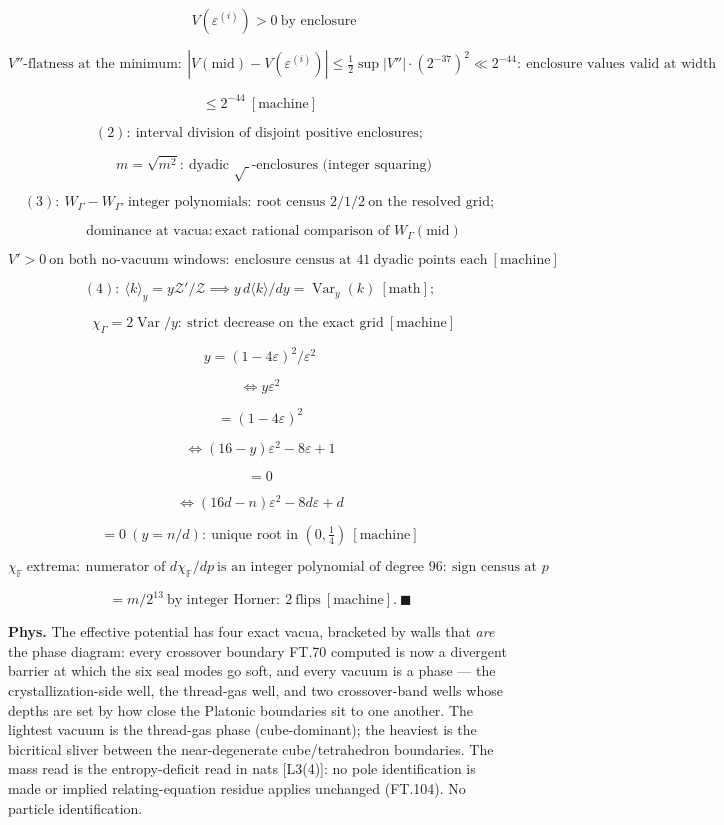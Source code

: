 \begin{theorem}
\[
\qquad V(\varepsilon^{(i)})>0\ \text{by enclosure}
\]

\[
V''\text{-flatness at the minimum}:\ |V(\text{mid})-V(\varepsilon^{(i)})|\le\tfrac12\sup|V''|\cdot(2^{-37})^2\ll2^{-44}:\ \text{enclosure values valid at width}
\]

\[
\le 2^{-44}\ [\text{machine}]
\]

\[
(2):\ \text{interval division of disjoint positive enclosures};
\]

\[
\qquad m=\sqrt{m^2}:\ \text{dyadic }\sqrt{\ }\text{-enclosures (integer squaring)}
\]

\[
(3):\ W_\Gamma-W_{\Gamma'}\ \text{integer polynomials}:\ \text{root census }2/1/2\ \text{on the resolved grid};
\]

\[
\qquad \text{dominance at vacua}: \text{exact rational comparison of }W_\Gamma(\text{mid})
\]

\[
V'>0\ \text{on both no-vacuum windows}:\ \text{enclosure census at }41\ \text{dyadic points each}\ [\text{machine}]
\]

\[
(4):\ \langle k\rangle_y=y\mathcal Z'/\mathcal Z\implies y\,d\langle k\rangle/dy=\operatorname{Var}_y(k)\ [\text{math}];
\]

\[
\qquad \chi_\Gamma=2\operatorname{Var}/y:\ \text{strict decrease on the exact grid}\ [\text{machine}]
\]

\[
y = (1-4\varepsilon)^2/\varepsilon^2
\]

\[
\iff y\varepsilon^2
\]

\[
= (1-4\varepsilon)^2
\]

\[
\iff (16-y)\varepsilon^2-8\varepsilon+1
\]

\[
= 0
\]

\[
\iff (16d-n)\varepsilon^2-8d\varepsilon+d
\]

\[
= 0\ (y=n/d):\ \text{unique root in }(0,\tfrac14)\ [\text{machine}]
\]

\[
\chi_{\mathbb F}\ \text{extrema}:\ \text{numerator of }d\chi_{\mathbb F}/dp\ \text{is an integer polynomial of degree }96:\ \text{sign census at }p
\]

\[
= m/2^{13}\ \text{by integer Horner}:\ 2\ \text{flips}\ [\text{machine}].\ \blacksquare
\]

\textbf{Phys.} The effective potential has four exact vacua, bracketed by walls that \textit{are} the phase diagram: every crossover boundary FT.70 computed is now a divergent barrier at which the six seal modes go soft, and every vacuum is a phase — the crystallization-side well, the thread-gas well, and two crossover-band wells whose depths are set by how close the Platonic boundaries sit to one another. The lightest vacuum is the thread-gas phase (cube-dominant); the heaviest is the bicritical sliver between the near-degenerate cube/tetrahedron boundaries. The mass read is the entropy-deficit read in nats [L3(4)]: no pole identification is made or implied relating-equation residue applies unchanged (FT.104). No particle identification.


\end{theorem}
